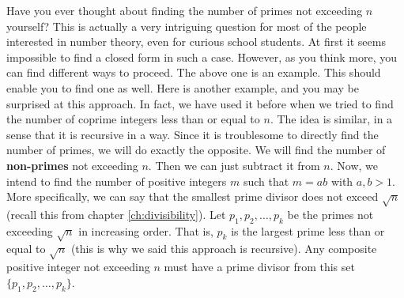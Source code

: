 \documentclass{subfiles}
\begin{document}
	Have you ever thought about finding the number of primes not exceeding $n$ yourself? This is actually a very intriguing question for most of the people interested in number theory, even for curious school students. At first it seems impossible to find a closed form in such a case. However, as you think more, you can find different ways to proceed. The above one is an example. This should enable you to find one as well. Here is another example, and you may be surprised at this approach. In fact, we have used it before when we tried to find the number of coprime integers less than or equal to $n$. The idea is similar, in a sense that it is recursive in a way. Since it is troublesome to directly find the number of primes, we will do exactly the opposite. We will find the number of \textbf{non-primes} not exceeding $n$. Then we can just subtract it from $n$. Now, we intend to find the number of positive integers $m$ such that $m=ab$ with $a,b>1$. More specifically, we can say that the smallest prime divisor does not exceed $\sqrt{n}$ (recall this from chapter \eqref{ch:divisibility}). Let $p_1,p_2,\ldots,p_k$ be the primes not exceeding $\sqrt{n}$ in increasing order. That is, $p_k$ is the largest prime less than or equal to $\sqrt{n}$ (this is why we said this approach is recursive). Any composite positive integer not exceeding $n$ must have a prime divisor from this set $\{p_1,p_2,\ldots,p_k\}$.
	
\end{document}
